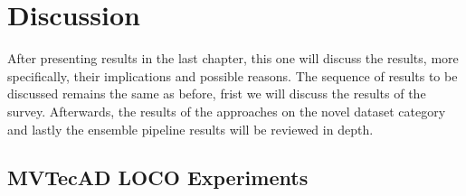 \chapter{Discussion}
\label{chap:results}

After presenting results in the last chapter, this one will discuss the results, more specifically, their implications and possible reasons. 
The sequence of results to be discussed remains the same as before, frist we will discuss the results of the survey. Afterwards, the results of the approaches on the novel dataset 
category and lastly the ensemble pipeline results will be reviewed in depth.


\section{MVTecAD LOCO Experiments}
\label{sec:locoresultssota}

